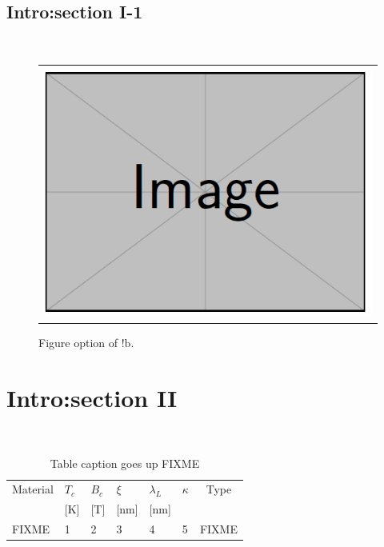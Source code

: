 \documentclass[doctor]{snuee}
\begin{document}
\subsection{Intro:section I-1}
\lipsum[1-4]~\cite{anderson1964hard}

\begin{figure}[!b]
	{
	\begin{center}
		\begin{tabular}{c}
			\includegraphics[width=0.9\linewidth]{dummy.png}
		\end{tabular}
	\end{center}
	}
	\caption[dummy image FIXME2 with long long long long long long long title]{Figure option of $!\text{b}$.}
\label{dummy_img2}
\end{figure}

\section{Intro:section II}
\lipsum[1-4]~\cite{anderson1964hard}

\begin{table}[htbp]
	\renewcommand{\arraystretch}{1.6}
	\setlength{\tabcolsep}{10pt}
	\caption{Table caption goes up FIXME}
	\label{tbl2_1}
	\centering
	\begin{tabular}{l l l l l l c}
	\hline\hline
	Material & $T_c$ & $B_c$& $\xi$ & $\lambda_L$ & $\kappa$ & Type \\
	\hfill & [K] & [T] & [nm] & [nm] & \hfill & \hfill \\
	\hline
	FIXME & 1 & 2 & 3 & 4 & 5 & FIXME \\
	\hline\hline
	\end{tabular}
\end{table}
\end{document}

